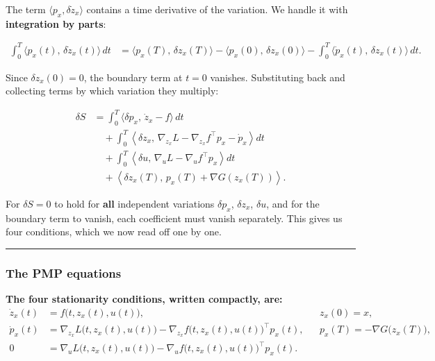 \documentclass{article}
\begin{document}
\begin{physicsinsightbox}
The term $\langle p_x, \delta\dot{z}_x\rangle$ contains a time derivative of the variation. We handle it with \textbf{integration by parts}:

\begin{align*}
\int_0^T \langle p_x(t),\, \delta\dot{z}_x(t) \rangle\, dt
&= \langle p_x(T),\, \delta z_x(T) \rangle
 - \langle p_x(0),\, \delta z_x(0) \rangle
 - \int_0^T \langle \dot{p}_x(t),\, \delta z_x(t) \rangle\, dt .
\end{align*}

Since $\delta z_x(0) = 0$, the boundary term at $t = 0$ vanishes. Substituting back and collecting terms by which variation they multiply:

\begin{align*}
\delta S
&= \int_0^T \langle \delta p_x,\, \dot{z}_x - f \rangle\, dt \\
&\quad + \int_0^T \left\langle \delta z_x,\, \nabla_{z_x} L - \nabla_{z_x} f^\top p_x - \dot{p}_x \right\rangle dt \\
&\quad + \int_0^T \left\langle \delta u,\, \nabla_u L - \nabla_u f^\top p_x \right\rangle dt \\
&\quad + \left\langle \delta z_x(T),\, p_x(T) + \nabla G(z_x(T)) \right\rangle .
\end{align*}

For $\delta S = 0$ to hold for \textbf{all} independent variations $\delta p_x$, $\delta z_x$, $\delta u$, and for the boundary term to vanish, each coefficient must vanish separately. This gives us four conditions, which we now read off one by one.
\end{physicsinsightbox}

\medskip\hrule\medskip

\subsubsection{The PMP equations}

\textbf{The four stationarity conditions, written compactly, are:}
\begin{align*}
\dot{z}_x(t) &= f\bigl(t, z_x(t), u(t)\bigr), & & z_x(0) = x, \\
\dot{p}_x(t) &= \nabla_{z_x} L\bigl(t, z_x(t), u(t)\bigr) - \nabla_{z_x} f\bigl(t, z_x(t), u(t)\bigr)^\top p_x(t), & & p_x(T) = -\nabla G\bigl(z_x(T)\bigr), \\
0 &= \nabla_u L\bigl(t, z_x(t), u(t)\bigr) - \nabla_u f\bigl(t, z_x(t), u(t)\bigr)^\top p_x(t). & &
\end{align*}
\end{document}
